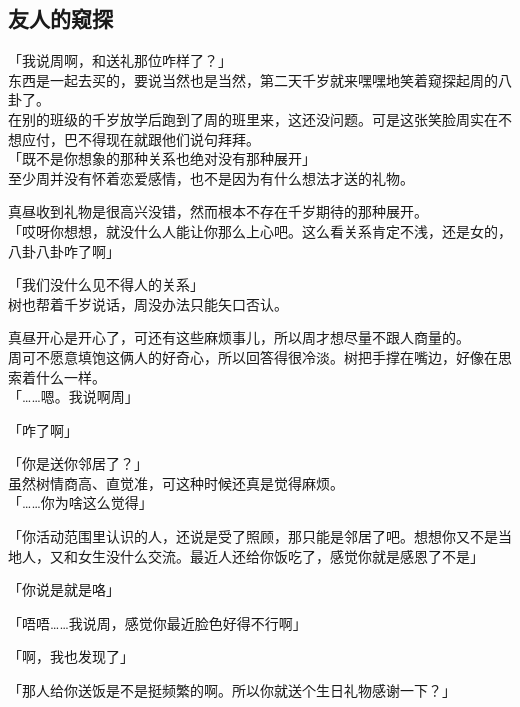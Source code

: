 \subsection{友人的窥探}

「我说周啊，和送礼那位咋样了？」\\

东西是一起去买的，要说当然也是当然，第二天千岁就来嘿嘿地笑着窥探起周的八卦了。\\

在别的班级的千岁放学后跑到了周的班里来，这还没问题。可是这张笑脸周实在不想应付，巴不得现在就跟他们说句拜拜。\\

「既不是你想象的那种关系也绝对没有那种展开」\\

至少周并没有怀着恋爱感情，也不是因为有什么想法才送的礼物。

真昼收到礼物是很高兴没错，然而根本不存在千岁期待的那种展开。\\

「哎呀你想想，就没什么人能让你那么上心吧。这么看关系肯定不浅，还是女的，八卦八卦咋了啊」

「我们没什么见不得人的关系」\\

树也帮着千岁说话，周没办法只能矢口否认。

真昼开心是开心了，可还有这些麻烦事儿，所以周才想尽量不跟人商量的。\\

周可不愿意填饱这俩人的好奇心，所以回答得很冷淡。树把手撑在嘴边，好像在思索着什么一样。\\

「……嗯。我说啊周」

「咋了啊」

「你是送你邻居了？」\\

虽然树情商高、直觉准，可这种时候还真是觉得麻烦。\\

「……你为啥这么觉得」

「你活动范围里认识的人，还说是受了照顾，那只能是邻居了吧。想想你又不是当地人，又和女生没什么交流。最近人还给你饭吃了，感觉你就是感恩了不是」

「你说是就是咯」

「唔唔……我说周，感觉你最近脸色好得不行啊」

「啊，我也发现了」

「那人给你送饭是不是挺频繁的啊。所以你就送个生日礼物感谢一下？」\\

